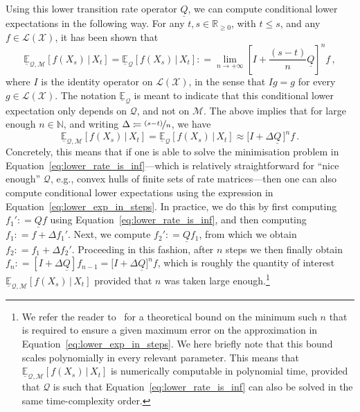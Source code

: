 \documentclass[twoside,11pt]{article}
\newcommand{\nats}{\mathbb{N}}
\newcommand{\reals}{\mathbb{R}}
\newcommand{\realsnonneg}{\reals_{\geq 0}}
\newcommand{\states}{\mathcal{X}}
\newcommand{\lexp}{\underline{\mathbb{E}}_{\rateset,\mathcal{M}}}
\newcommand{\gambles}{\mathcal{L}}
\newcommand{\gamblesX}{\gambles(\states)}
\newcommand{\rateset}{\mathcal{Q}}
\newcommand{\lrate}{\underline{Q}}
\newcommand{\coloneqq}{:\!=}
\begin{document}
Using this lower transition rate operator $\lrate$, we can compute conditional lower expectations in the following way. For any $t,s\in\realsnonneg$, with $t\leq s$, and any $f\in\gamblesX$, it has been shown that
\begin{equation*}
\lexp[f(X_s)\,\vert\,X_t] = \underline{\mathbb{E}}_\rateset[f(X_s)\,\vert\,X_t] \coloneqq \lim_{n\to+\infty}\left[I+\frac{(s-t)}{n}\lrate\right]^n f\,,
\end{equation*}
where $I$ is the identity operator on $\gamblesX$, in the sense that $I g=g$ for every $g\in\gamblesX$.
The notation $\underline{\mathbb{E}}_\rateset$ is meant to indicate that this conditional lower expectation only depends on $\rateset$, and not on $\mathcal{M}$. The above implies that for large enough $n\in\nats$, and writing $\Delta\coloneqq \nicefrac{(s-t)}{n}$, we have
\begin{equation}\label{eq:lower_exp_in_steps}
\lexp[f(X_s)\,\vert\,X_t] = \underline{\mathbb{E}}_\rateset[f(X_s)\,\vert\,X_t] \approx \bigl[I + \Delta\lrate\,\bigr]^nf\,.
\end{equation}
Concretely, this means that if one is able to solve the minimisation problem in Equation~\eqref{eq:lower_rate_is_inf}---which is relatively straightforward for ``nice enough'' $\rateset$, e.g., convex hulls of finite sets of rate matrices---then one can also compute conditional lower expectations using the expression in Equation~\ref{eq:lower_exp_in_steps}. In practice, we do this by first computing $f_1'\coloneqq \lrate f$ using Equation~\eqref{eq:lower_rate_is_inf}, and then computing $f_1\coloneqq f + \Delta f_1'$. Next, we compute $f_2'\coloneqq \lrate f_1$, from which we obtain $f_2\coloneqq f_1 + \Delta f_2'$. Proceeding in this fashion, after $n$ steps we then finally obtain $f_n \coloneqq [I+\Delta\lrate]f_{n-1} = \bigl[I+\Delta\lrate\bigr]^nf$, which is roughly the quantity of interest $\underline{\mathbb{E}}_{\rateset,\mathcal{M}}[f(X_s)\,\vert\,X_t]$ provided that $n$ was taken large enough.\footnote{We refer the reader to~\citep[Proposition 8.5]{krak2016ictmc} for a theoretical bound on the minimum such $n$ that is required to ensure a given maximum error on the approximation in Equation~\eqref{eq:lower_exp_in_steps}. We here briefly note that this bound scales polynomially in every relevant parameter. This means that $\lexp[f(X_s)\,\vert\,X_t]$ is numerically computable in polynomial time, provided that $\rateset$ is such that Equation~\eqref{eq:lower_rate_is_inf} can also be solved in the same time-complexity order.}
\end{document}

